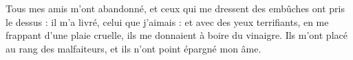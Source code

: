 Tous mes amis m’ont abandonné,
et ceux qui me dressent des embûches ont pris le dessus :
il m’a livré, celui que j’aimais :
et avec des yeux terrifiants, en me frappant d’une plaie cruelle,
ils me donnaient à boire du vinaigre.
\versseparator
Ils m'ont placé au rang des malfaiteurs, et ils n'ont point épargné mon âme.